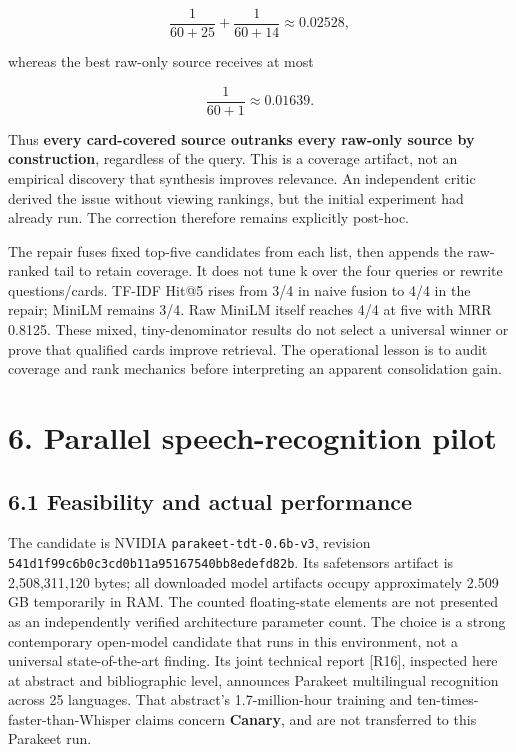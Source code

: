 \documentclass[
  10pt,
]{article}
\begin{document}
\[\frac{1}{60+25}+\frac{1}{60+14} \approx 0.02528,\]

whereas the best raw-only source receives at most

\[\frac{1}{60+1} \approx 0.01639.\]

Thus \textbf{every card-covered source outranks every raw-only source by
construction}, regardless of the query. This is a coverage artifact, not
an empirical discovery that synthesis improves relevance. An independent
critic derived the issue without viewing rankings, but the initial
experiment had already run. The correction therefore remains explicitly
post-hoc.

The repair fuses fixed top-five candidates from each list, then appends
the raw-ranked tail to retain coverage. It does not tune k over the four
queries or rewrite questions/cards. TF-IDF Hit@5 rises from 3/4 in naive
fusion to 4/4 in the repair; MiniLM remains 3/4. Raw MiniLM itself
reaches 4/4 at five with MRR 0.8125. These mixed, tiny-denominator
results do not select a universal winner or prove that qualified cards
improve retrieval. The operational lesson is to audit coverage and rank
mechanics before interpreting an apparent consolidation gain.

\section{6. Parallel speech-recognition
pilot}\label{parallel-speech-recognition-pilot}

\subsection{6.1 Feasibility and actual
performance}\label{feasibility-and-actual-performance}

The candidate is NVIDIA \texttt{parakeet-tdt-0.6b-v3}, revision
\nolinkurl{541d1f99c6b0c3cd0b11a95167540bb8edefd82b}. Its safetensors
artifact is 2,508,311,120 bytes; all downloaded model artifacts occupy
approximately 2.509 GB temporarily in RAM. The counted floating-state
elements are not presented as an independently verified architecture
parameter count. The choice is a strong contemporary open-model
candidate that runs in this environment, not a universal
state-of-the-art finding. Its joint technical report {[}R16{]},
inspected here at abstract and bibliographic level, announces Parakeet
multilingual recognition across 25 languages. That abstract's
1.7-million-hour training and ten-times-faster-than-Whisper claims
concern \textbf{Canary}, and are not transferred to this Parakeet run.
\end{document}
